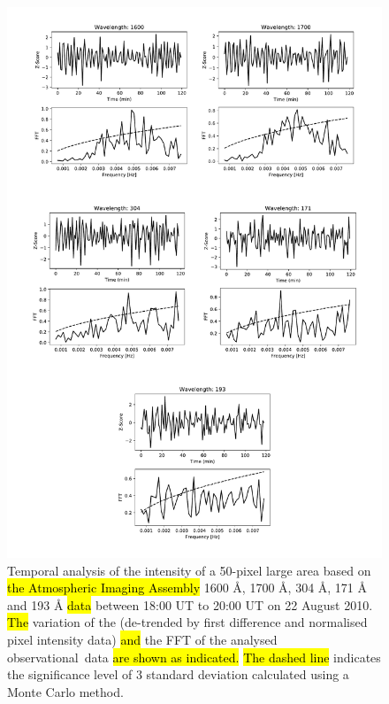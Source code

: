 \documentclass[physics,article,accept,pdftex,moreauthors]{Definitions/mdpi}
\begin{document}
\begin{figure}[H]
        \includegraphics[scale=0.55]{QS_FFT.pdf}
    \caption{Temporal analysis of the intensity of a 50-pixel large area based on %
\hl{the Atmospheric Imaging Assembly} 
 1600 {\AA}, 1700 {\AA}, 304 {\AA}, 171 {\AA} and 193 {\AA} \hl{data} %
between 18:00 UT to 20:00 UT on 22 August 2010. 
 \hl{The} %
 variation of the  
(de-trended by first difference and normalised pixel intensity data) \hl{and} %
the FFT of the 
analysed observational~data \hl{are shown as indicated.}
\hl{The dashed line} indicates  the significance level of 3 standard deviation calculated using a Monte Carlo method. %
\label{fig12}}
\end{figure}
\end{document}
